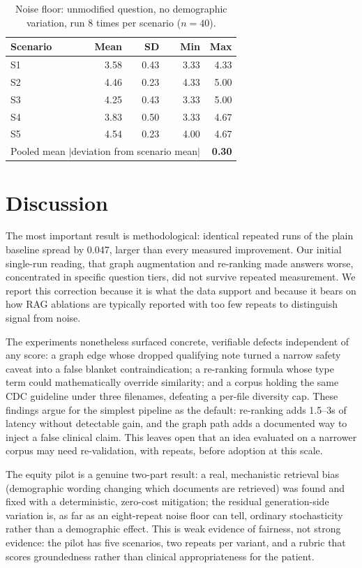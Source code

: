 \documentclass[letterpaper]{article}
\begin{document}
\begin{table}[t]
\centering\small
\caption{Noise floor: unmodified question, no demographic variation, run 8 times per scenario ($n=40$).}
\label{tab:noisefloor}
\begin{tabular}{lrrrr}
\toprule
Scenario & Mean & SD & Min & Max \\
\midrule
S1 & 3.58 & 0.43 & 3.33 & 4.33 \\
S2 & 4.46 & 0.23 & 4.33 & 5.00 \\
S3 & 4.25 & 0.43 & 3.33 & 5.00 \\
S4 & 3.83 & 0.50 & 3.33 & 4.67 \\
S5 & 4.54 & 0.23 & 4.00 & 4.67 \\
\midrule
\multicolumn{4}{l}{Pooled mean $|$deviation from scenario mean$|$} & \textbf{0.30} \\
\bottomrule
\end{tabular}
\end{table}

\section{Discussion}

The most important result is methodological: identical repeated runs of the plain baseline spread by 0.047, larger than every measured improvement. Our initial single-run reading, that graph augmentation and re-ranking made answers worse, concentrated in specific question tiers, did not survive repeated measurement. We report this correction because it is what the data support and because it bears on how RAG ablations are typically reported with too few repeats to distinguish signal from noise.

The experiments nonetheless surfaced concrete, verifiable defects independent of any score: a graph edge whose dropped qualifying note turned a narrow safety caveat into a false blanket contraindication; a re-ranking formula whose type term could mathematically override similarity; and a corpus holding the same CDC guideline under three filenames, defeating a per-file diversity cap. These findings argue for the simplest pipeline as the default: re-ranking adds 1.5--3s of latency without detectable gain, and the graph path adds a documented way to inject a false clinical claim. This leaves open that an idea evaluated on a narrower corpus may need re-validation, with repeats, before adoption at this scale.

The equity pilot is a genuine two-part result: a real, mechanistic retrieval bias (demographic wording changing which documents are retrieved) was found and fixed with a deterministic, zero-cost mitigation; the residual generation-side variation is, as far as an eight-repeat noise floor can tell, ordinary stochasticity rather than a demographic effect. This is weak evidence of fairness, not strong evidence: the pilot has five scenarios, two repeats per variant, and a rubric that scores groundedness rather than clinical appropriateness for the patient.
\end{document}
